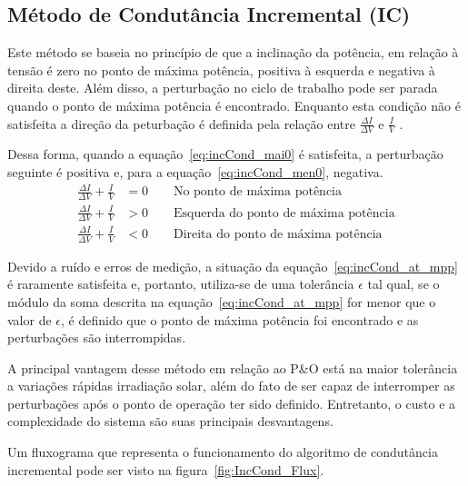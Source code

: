 \documentclass[
	12pt,				%
	openright,			%
	onseside,
	a4paper,			%
	english,			%
	french,				%
	spanish,			%
	brazil,				%
	]{abntex2}
\begin{document}
\subsection{Método de Condutância Incremental (IC)}

Este método se baseia no princípio de que a inclinação da potência, em relação à tensão é zero no ponto de máxima potência, positiva à esquerda e negativa à direita deste. Além disso, a perturbação no ciclo de trabalho pode ser parada quando o ponto de máxima potência é encontrado. Enquanto esta condição não é satisfeita a direção da peturbação é definida pela relação entre $\frac{\Delta I}{\Delta V}$ e $\frac{I}{V}$ \cite{Talha_MPPT}\cite{MPPT_P&O_IC}.

Dessa forma, quando a equação~\ref{eq:incCond_mai0} é satisfeita, a perturbação seguinte é positiva e, para a equação~\ref{eq:incCond_men0}, negativa.
\begin{align}%
	\frac{\Delta I}{\Delta V} + \frac{I}{V} &= 0 \qquad \text{No ponto de máxima potência} \label{eq:incCond_at_mpp}\\
	\frac{\Delta I}{\Delta V} + \frac{I}{V} &> 0 \qquad \text{Esquerda do ponto de máxima potência} \label{eq:incCond_mai0}\\
	\frac{\Delta I}{\Delta V} + \frac{I}{V} &< 0 \qquad \text{Direita do ponto de máxima potência} \label{eq:incCond_men0}
\end{align}

Devido a ruído e erros de medição, a situação da equação~\ref{eq:incCond_at_mpp} é raramente satisfeita e, portanto, utiliza-se de uma tolerância $\epsilon$ tal qual, se o módulo da soma descrita na equação~\ref{eq:incCond_at_mpp} for menor que o valor de $\epsilon$, é definido que o ponto de máxima potência foi encontrado e as perturbações são interrompidas\cite{Talha_MPPT}.

A principal vantagem desse método em relação ao P\&O está na maior tolerância a variações rápidas irradiação solar, além do fato de ser capaz de interromper as perturbações após o ponto de operação ter sido definido. Entretanto, o custo e a complexidade do sistema são suas principais desvantagens\cite{MPPT_P&O_IC}.

Um fluxograma que representa o funcionamento do algoritmo de condutância incremental pode ser visto na figura~\ref{fig:IncCond_Flux}.
\end{document}
